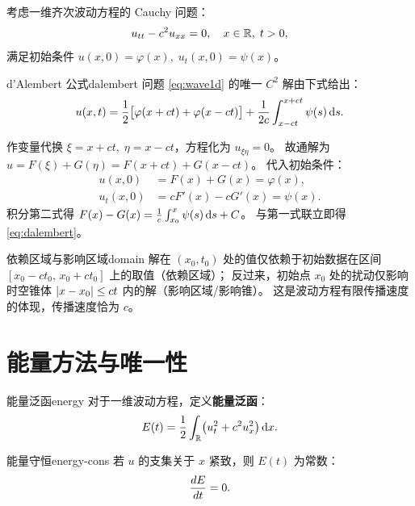 \documentclass[11pt,a4paper,openany,oneside]{ctexbook}
\begin{document}
考虑一维齐次波动方程的 Cauchy 问题：
\begin{equation}\label{eq:wave1d}
  u_{tt} - c^{2}u_{xx} = 0,\quad x\in\mathbb{R},\; t>0,
\end{equation}
满足初始条件 $u(x,0)=\varphi(x),\; u_{t}(x,0)=\psi(x)$。

\begin{theorem}{d'Alembert 公式}{dalembert}
  问题 \eqref{eq:wave1d} 的唯一 $C^{2}$ 解由下式给出：
  \begin{equation}\label{eq:dalembert}
    u(x,t) = \frac{1}{2}\bigl[\varphi(x+ct)+\varphi(x-ct)\bigr]
           + \frac{1}{2c}\int_{x-ct}^{x+ct} \psi(s)\,\mathrm{d} s.
  \end{equation}
\end{theorem}

\begin{proofbox}
  作变量代换 $\xi=x+ct,\;\eta=x-ct$，方程化为 $u_{\xi\eta}=0$。
  故通解为 $u=F(\xi)+G(\eta)=F(x+ct)+G(x-ct)$。
  代入初始条件：
  \begin{align*}
    u(x,0) &= F(x)+G(x) = \varphi(x),\\
    u_{t}(x,0) &= cF'(x)-cG'(x) = \psi(x).
  \end{align*}
  积分第二式得 $F(x)-G(x)=\frac{1}{c}\int_{x_{0}}^{x}\psi(s)\,\mathrm{d} s + C$。
  与第一式联立即得 \eqref{eq:dalembert}。
\end{proofbox}

\begin{corollary}{依赖区域与影响区域}{domain}
  解在 $(x_{0},t_{0})$ 处的值仅依赖于初始数据在区间 $[x_{0}-ct_{0},\,x_{0}+ct_{0}]$ 上的取值（依赖区域）；
  反过来，初始点 $x_{0}$ 处的扰动仅影响时空锥体 $\left| x-x_{0} \right|\le ct$ 内的解（影响区域/影响锥）。
  这是波动方程有限传播速度的体现，传播速度恰为 $c$。
\end{corollary}

\section{能量方法与唯一性}

\begin{definition}{能量泛函}{energy}
  对于一维波动方程，定义\textbf{能量泛函}：
  $$
  E(t) = \frac{1}{2}\int_{\mathbb{R}} \bigl(u_{t}^{2} + c^{2}u_{x}^{2}\bigr)\,\mathrm{d} x.
  $$
\end{definition}

\begin{theorem}{能量守恒}{energy-cons}
  若 $u$ 的支集关于 $x$ 紧致，则 $E(t)$ 为常数：
  $$
  \frac{d E}{d t} = 0.
  $$
\end{theorem}
\end{document}
